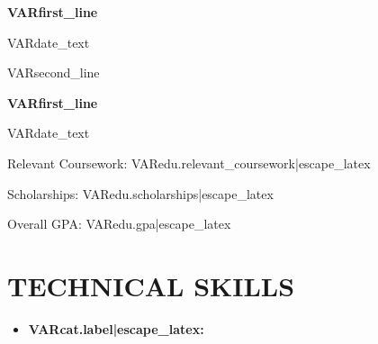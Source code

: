 \documentclass[10pt,letterpaper]{article}
\newcommand{\entryvspace}{\vspace{0pt}}
\newcommand{\sectionvspace}{\vspace{1pt}}
\newcommand{\entryvspace}{\vspace{1pt}}
\newcommand{\sectionvspace}{\vspace{3pt}}
\newcommand{\entryvspace}{\vspace{11pt}}
\newcommand{\sectionvspace}{\vspace{11pt}}
\newcommand{\entryvspace}{\vspace{5pt}}
\newcommand{\sectionvspace}{\vspace{5pt}}
\newcommand{\resumeEducation}[2]{
  \noindent
  \begin{minipage}[t]{0.7\textwidth}
    \textbf{#1}
  \end{minipage}
  \hfill
  \begin{minipage}[t]{0.25\textwidth}
    \raggedleft #2
  \end{minipage}
  \vspace{1pt}
}
\newcommand{\resumeEducationSplit}[3]{
  \noindent
  \begin{minipage}[t]{0.7\textwidth}
    \textbf{#1}
  \end{minipage}
  \hfill
  \begin{minipage}[t]{0.25\textwidth}
    \raggedleft #2
  \end{minipage}
  \par\noindent #3
  \vspace{1pt}
}
\begin{document}
\par
\resumeEducationSplit{VAR{first_line}}{VAR{date_text}}{VAR{second_line}}
\resumeEducation{VAR{first_line}}{VAR{date_text}}

\par\noindent Relevant Coursework: VAR{edu.relevant_coursework|escape_latex}

\par\noindent Scholarships: VAR{edu.scholarships|escape_latex}

\par\noindent Overall GPA: VAR{edu.gpa|escape_latex}
\entryvspace

\section*{TECHNICAL SKILLS}
\begin{itemize}
  \item \textbf{VAR{cat.label|escape_latex}:} %
\end{itemize}
\sectionvspace

\end{document}

